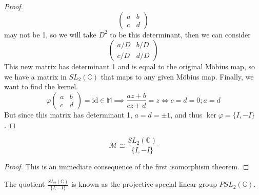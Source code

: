 \begin{proof}
\[\begin{pmatrix}
			a & b \\ c & d
		\end{pmatrix}
	\]
	may not be 1, so we will take \(D^2\) to be this determinant, then we can consider
	\[
		\begin{pmatrix}
			a/D & b/D \\ c/D & d/D
		\end{pmatrix}
	\]
	This new matrix has determinant 1 and is equal to the original M\"obius map, so we have a matrix in \(SL_2(\mathbb C)\) that maps to any given M\"obius map.
	Finally, we want to find the kernel.
	\[
		\varphi \begin{pmatrix}
			a & b \\ c & d
		\end{pmatrix} = \text{id} \in \mathbb M \implies \frac{az+b}{cz+d} = z \iff c = d = 0; a = d
	\]
	But since this matrix has determinant 1, \(a = d = \pm 1\), and thus \(\ker \varphi = \{ I, -I \}\).
\end{proof}
\begin{corollary}
	\[
		\mathcal M \cong \frac{SL_2(\mathbb C)}{\{ I, -I \}}
	\]
\end{corollary}
\begin{proof}
	This is an immediate consequence of the first isomorphism theorem.
\end{proof}
The quotient \(\frac{SL_2(\mathbb C)}{\{ I, -I \}}\) is known as the projective special linear group \(PSL_2(\mathbb C)\).

